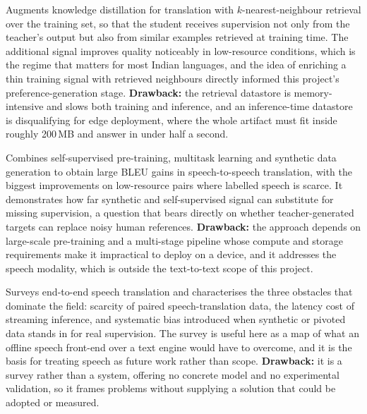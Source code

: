 Augments knowledge distillation for translation with $k$-nearest-neighbour
retrieval over the training set, so that the student receives supervision not
only from the teacher's output but also from similar examples retrieved at
training time. The additional signal improves quality noticeably in
low-resource conditions, which is the regime that matters for most Indian
languages, and the idea of enriching a thin training signal with retrieved
neighbours directly informed this project's preference-generation stage.
\textbf{Drawback:} the retrieval datastore is memory-intensive and slows both
training and inference, and an inference-time datastore is disqualifying for
edge deployment, where the whole artifact must fit inside roughly 200\,MB and
answer in under half a second.

Combines self-supervised pre-training, multitask learning and synthetic
data generation to obtain large BLEU gains in speech-to-speech translation,
with the biggest improvements on low-resource pairs where labelled speech is
scarce. It demonstrates how far synthetic and self-supervised signal can
substitute for missing supervision, a question that bears directly on whether
teacher-generated targets can replace noisy human references.
\textbf{Drawback:} the approach depends on large-scale pre-training and a
multi-stage pipeline whose compute and storage requirements make it impractical
to deploy on a device, and it addresses the speech modality, which is outside
the text-to-text scope of this project.

Surveys end-to-end speech translation and characterises the three
obstacles that dominate the field: scarcity of paired speech-translation data,
the latency cost of streaming inference, and systematic bias introduced when
synthetic or pivoted data stands in for real supervision. The survey is useful
here as a map of what an offline speech front-end over a text engine would have
to overcome, and it is the basis for treating speech as future work rather than
scope. \textbf{Drawback:} it is a survey rather than a system, offering no
concrete model and no experimental validation, so it frames problems without
supplying a solution that could be adopted or measured.

